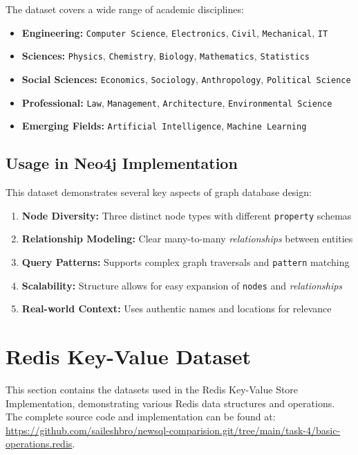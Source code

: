 The dataset covers a wide range of academic disciplines:
\begin{itemize}
    \item \textbf{Engineering:} \texttt{Computer Science}, \texttt{Electronics}, \texttt{Civil}, \texttt{Mechanical}, \texttt{IT}
    \item \textbf{Sciences:} \texttt{Physics}, \texttt{Chemistry}, \texttt{Biology}, \texttt{Mathematics}, \texttt{Statistics}
    \item \textbf{Social Sciences:} \texttt{Economics}, \texttt{Sociology}, \texttt{Anthropology}, \texttt{Political Science}
    \item \textbf{Professional:} \texttt{Law}, \texttt{Management}, \texttt{Architecture}, \texttt{Environmental Science}
    \item \textbf{Emerging Fields:} \texttt{Artificial Intelligence}, \texttt{Machine Learning}
\end{itemize}

\subsection{Usage in Neo4j Implementation}

This dataset demonstrates several key aspects of graph database design:

\begin{enumerate}
    \item \textbf{Node Diversity:} Three distinct node types with different \texttt{property} schemas
    \item \textbf{Relationship Modeling:} Clear many-to-many \textit{relationships} between entities
    \item \textbf{Query Patterns:} Supports complex graph traversals and \texttt{pattern} matching
    \item \textbf{Scalability:} Structure allows for easy expansion of \texttt{nodes} and \textit{relationships}
    \item \textbf{Real-world Context:} Uses authentic names and locations for relevance
\end{enumerate}

\section{Redis Key-Value Dataset}

This section contains the datasets used in the Redis Key-Value Store Implementation, demonstrating various Redis data structures and operations. The complete source code and implementation can be found at: \url{https://github.com/saileshbro/newsql-comparision.git/tree/main/task-4/basic-operations.redis}.

